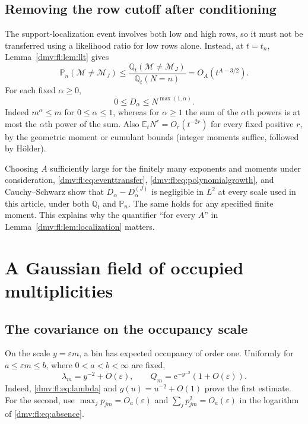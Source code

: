 \documentclass[11pt,letterpaper]{article}
\numberwithin{equation}{section}
\theoremstyle{definition}\newtheorem{definition}[theorem]{Definition}
\theoremstyle{remark}\newtheorem{remark}[theorem]{Remark}
\newcommand{\E}{\mathbb E}
\newcommand{\ee}{\mathrm e}
\newcommand{\Pp}{\mathbb P}
\newcommand{\Q}{\mathbb Q}
\newcommand{\eps}{\varepsilon}
\begin{document}
\subsection{Removing the row cutoff after conditioning}
The support-localization event involves both low and high rows, so it
must not be transferred using a likelihood ratio for low rows alone.
Instead, at $t=t_n$, Lemma~\ref{dmv:fl:lem:llt} gives
\begin{equation}\label{dmv:fl:eq:eventtransfer}
 \Pp_n(\mathcal M\ne\mathcal M_J)
 \le\frac{\Q_t(\mathcal M\ne\mathcal M_J)}{\Q_t(N=n)}
 =O_A(t^{A-3/2}).
\end{equation}
For each fixed $\alpha\ge0$,
\begin{equation}\label{dmv:fl:eq:polynomialgrowth}
 0\le D_\alpha\le N^{\max(1,\alpha)}.
\end{equation}
Indeed $m^\alpha\le m$ for $0\le\alpha\le1$, whereas for
$\alpha\ge1$ the sum of the $\alpha$th powers is at most the $\alpha$th
power of the sum. Also $\E_tN^r=O_r(t^{-2r})$ for every fixed positive
$r$, by the geometric moment or cumulant bounds (integer moments
suffice, followed by H\"older).

Choosing $A$ sufficiently large for the finitely many exponents and
moments under consideration, \eqref{dmv:fl:eq:eventtransfer},
\eqref{dmv:fl:eq:polynomialgrowth}, and Cauchy--Schwarz show that
$D_\alpha-D_\alpha^{(J)}$ is negligible in $L^2$ at every scale used in
this article, under both $\Q_t$ and $\Pp_n$. The same holds for any
specified finite moment. This explains why the quantifier ``for every
$A$'' in Lemma~\ref{dmv:fl:lem:localization} matters.
\section{A Gaussian field of occupied multiplicities}\label{dmv:fl:sec:gaussian}

\subsection{The covariance on the occupancy scale}
On the scale $y=\eps m$, a bin has expected occupancy of order one.
Uniformly for $a\le\eps m\le b$, where $0<a<b<\infty$ are fixed,
\begin{equation}\label{dmv:fl:eq:localones}
 \lambda_m=y^{-2}+O(\eps),\qquad
 Q_m=\ee^{-y^{-2}}(1+O(\eps)).
\end{equation}
Indeed, \eqref{dmv:fl:eq:lambda} and $g(u)=u^{-2}+O(1)$ prove the first
estimate. For the second, use $\max_jp_{jm}=O_a(\eps)$ and
$\sum_jp_{jm}^2=O_a(\eps)$ in the logarithm of \eqref{dmv:fl:eq:absence}.
\end{document}
